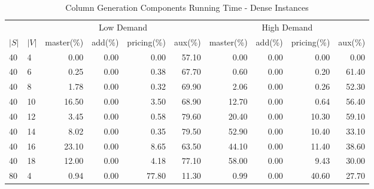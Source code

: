 \begin{table*}[h]
\begin{center}
\caption{Column Generation Components Running Time - Dense Instances}\label{tab:compdense}
\footnotesize
\begin{tabular} {l l | r r r r | r r r r }
\hline
     &                 &  \multicolumn{4}{c|}{Low Demand}                            & \multicolumn{4}{c}{High Demand} \\
$|S|$&           $|V|$ &  master(\%) &  add(\%)      &   pricing(\%)            &  aux(\%)     & master(\%) &            add(\%)       &             pricing(\%)  &  aux(\%) \\
\hline
40   &             4   &  0.00   &            0.00             &               0.00   &  57.10  &  0.00   &            0.00             &               0.00   &  0.00   \\
40   &             6   &  0.25   &            0.00             &               0.38   &  67.70  &  0.60   &            0.00             &               0.20   &  61.40  \\
40   &             8   &  1.78   &            0.00             &               0.32   &  69.90  &  2.06   &            0.00             &               0.26   &  52.30  \\
40   &             10  &  16.50  &            0.00             &               3.50   &  68.90  &  12.70  &            0.00             &               0.64   &  56.40  \\
40   &             12  &  3.45   &            0.00             &               0.58   &  79.60  &  20.40  &            0.00             &               10.30  &  59.10  \\
40   &             14  &  8.02   &            0.00             &               0.35   &  79.50  &  52.90  &            0.00             &               10.40  &  33.10  \\
40   &             16  &  23.10  &            0.00             &               8.65   &  63.50  &  44.10  &            0.00             &               11.40  &  38.60  \\
40   &             18  &  12.00  &            0.00             &               4.18   &  77.10  &  58.00  &            0.00             &               9.43   &  30.00  \\
80   &             4   &  0.94   &            0.00             &               77.80  &  11.30  &  0.99   &            0.00             &               40.60  &  27.70  \\

\end{tabular}
\end{center}
\end{table*}
